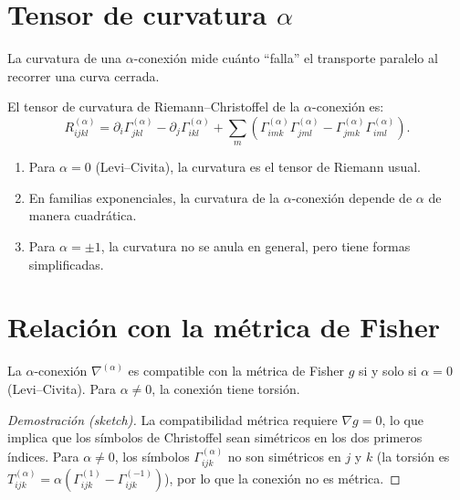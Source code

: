 \section[Tensor de curvatura alpha]{Tensor de curvatura $\alpha$}

La curvatura de una $\alpha$-conexión mide cuánto ``falla'' el transporte paralelo al recorrer una curva cerrada.

\begin{definition}
	El tensor de curvatura de Riemann--Christoffel de la $\alpha$-conexión es:
	\[
	R^{(\alpha)}_{ijkl} = \partial_i \Gamma^{(\alpha)}_{jkl} - \partial_j \Gamma^{(\alpha)}_{ikl} + \sum_{m} \left(\Gamma^{(\alpha)}_{imk}\Gamma^{(\alpha)}_{jml} - \Gamma^{(\alpha)}_{jmk}\Gamma^{(\alpha)}_{iml}\right).
	\]
\end{definition}

\begin{theorem}
	\begin{enumerate}
		\item Para $\alpha = 0$ (Levi--Civita), la curvatura es el tensor de Riemann usual.
		\item En familias exponenciales, la curvatura de la $\alpha$-conexión depende de $\alpha$ de manera cuadrática.
		\item Para $\alpha = \pm 1$, la curvatura no se anula en general, pero tiene formas simplificadas.
	\end{enumerate}
\end{theorem}

\section{Relación con la métrica de Fisher}

\begin{theorem}
	La $\alpha$-conexión $\nabla^{(\alpha)}$ es compatible con la métrica de Fisher $g$ si y solo si $\alpha = 0$ (Levi--Civita).  Para $\alpha \ne 0$, la conexión tiene torsión.
\end{theorem}

\begin{proof}[Demostración (sketch)]
	La compatibilidad métrica requiere $\nabla g = 0$, lo que implica que los símbolos de Christoffel sean simétricos en los dos primeros índices.  Para $\alpha \ne 0$, los símbolos $\Gamma^{(\alpha)}_{ijk}$ no son simétricos en $j$ y $k$ (la torsión es $T^{(\alpha)}_{ijk} = \alpha(\Gamma^{(1)}_{ijk} - \Gamma^{(-1)}_{ijk})$), por lo que la conexión no es métrica.
\end{proof}

